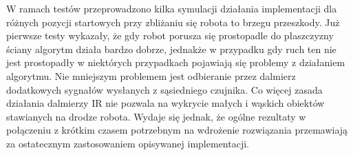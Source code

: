W ramach testów przeprowadzono kilka symulacji działania implementacji dla
różnych pozycji startowych przy zbliżaniu się robota to brzegu przeszkody. Już
pierwsze testy wykazały, że gdy robot porusza się prostopadle do płaszczyzny
ściany algorytm działa bardzo dobrze, jednakże w przypadku gdy ruch ten nie jest
prostopadły w niektórych przypadkach pojawiają się problemy z działaniem
algorytmu. Nie mniejszym problemem jest odbieranie przez dalmierz dodatkowych
sygnałów wysłanych z sąsiedniego czujnika. Co więcej zasada działania dalmierzy
IR nie pozwala na wykrycie małych i wąskich obiektów stawianych na drodze
robota. Wydaje się jednak, że ogólne rezultaty w połączeniu z krótkim czasem
potrzebnym na wdrożenie rozwiązania przemawiają za ostatecznym zastosowaniem
opisywanej implementacji.